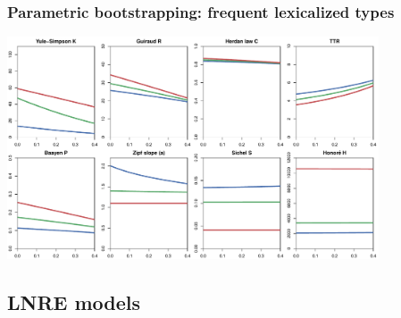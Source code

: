 \documentclass[t]{beamer} %
\begin{document}
\begin{frame}[c]
  \frametitle{Parametric bootstrapping: frequent lexicalized types}

  \centering
  \includegraphics[width=11cm]{img/lexconst_echo_type}
\end{frame}


\subsection{LNRE models}
\end{document}
